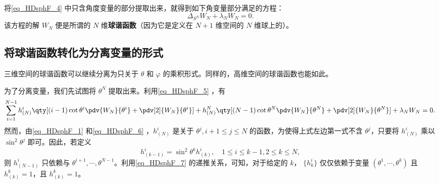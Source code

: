 将\autoref{eq_HDsphF_4} 中只含角度变量的部分提取出来，就得到如下角变量部分满足的方程：
\begin{equation}\label{eq_HDsphF_9}
\Delta_{S^N}W_N+\lambda_N W_N=0.~
\end{equation}
该方程的解 $W_N$ 便是所谓的 $N$ 维\textbf{球谐函数}（因为它是定义在 $N+1$ 维空间的 $N$ 维球上的）。

\subsection{将球谐函数转化为分离变量的形式}
三维空间的球谐函数可以继续分离为只关于 $\theta$ 和 $\varphi$ 的乘积形式。同样的，高维空间的球谐函数也能如此。

为了分离变量，我们先试图将 $\theta^N$ 提取出来。利用\autoref{eq_HDsphF_5} ，有
\begin{equation}\label{eq_HDsphF_8}
\sum_{i=1}^{N-1} h^{i}_{(N)}\qty[(i-1)\cot\theta^i\pdv{W_N}{\theta^i}+\pdv[2]{W_N}{\theta^i}]+h^{N}_{(N)}\qty[(N-1)\cot\theta^N\pdv{W_N}{\theta^N}+\pdv[2]{W_N}{\theta^N}]+\lambda_N W_N=0.~
\end{equation}
然而，由\autoref{eq_HDsphF_1} 和\autoref{eq_HDsphF_6} ，$h^i_{(N)}$ 是关于 $\theta^j,i+1\leq j\leq N$ 的函数，为使得上式左边第一式不含 $\theta^j$，只要将 $h^i_{(N)}$ 乘以 $\sin^2\theta^j$ 即可。因此，若定义
\begin{equation}\label{eq_HDsphF_7}
h^{i}_{(k-1)}=\sin^2\theta^k h^i_{(k)},\quad 1\leq i\leq k-1,2\leq k\leq N,~
\end{equation}
则 $h^i_{(N-1)}$ 只依赖与 $\theta ^{i+1},\cdots,\theta^{N-1}$。利用\autoref{eq_HDsphF_7} 的递推关系，可知，对于给定的 $k$， $\{h^i_{k}\}$ 仅仅依赖于变量 $(\theta^1,\cdots,\theta^k)$ 且 $h^k_{(k)}=1$，且 $h^k_{(k)}=1$。

